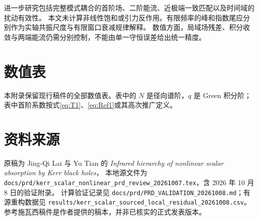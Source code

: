 \documentclass[UTF8,fontset=fandol,11pt,a4paper]{ctexart}
\numberwithin{equation}{section}
\begin{document}
进一步研究包括完整模式耦合的首阶场、二阶能流、近极端一致匹配以及时间域的扰动有效性。
本文未计算非线性饱和或引力反作用。有限频率的峰和指数尾应分别作为实轴共振尺度与有限窗口衰减规律解释。
数值方面，局域场残差、积分收敛与两端能流仍需分别控制，不能由单一守恒误差给出统一精度。

\FloatBarrier
\appendix
\section{数值表}
本附录保留现行稿件的全部数值表。表中的 $N$ 是径向谱阶，$q$ 是 Green 积分阶；
表中首阶系数按式\eqref{eq:T1}、\eqref{eq:Ref1}或其高次推广定义。

\FloatBarrier
\section{资料来源}
原稿为 Jing-Qi Lai 与 Yu Tian 的 \emph{Infrared hierarchy of nonlinear scalar absorption by Kerr black holes}，
本地源文件为 \nolinkurl{docs/prd/kerr_scalar_nonlinear_prd_review_20261007.tex}，含 2026 年 10 月 8 日的验证附录。
计算验证记录见 \nolinkurl{docs/prd/PRD_VALIDATION_20261008.md}；有源重构数据见
\nolinkurl{results/kerr_scalar_sourced_local_residual_20261008.csv}。
参考施瓦西稿件\cite{HeTianZhangManuscript2026}是作者提供的稿本，并非已核实的正式发表版本。

\end{document}
